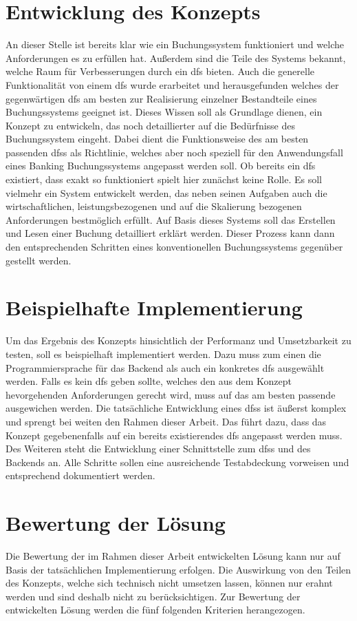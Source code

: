 \documentclass[12pt,oneside,a4paper,parskip]{scrbook}
\begin{document}
\section{Entwicklung des Konzepts}
An dieser Stelle ist bereits klar wie ein Buchungssystem funktioniert und welche Anforderungen es zu erfüllen hat. Außerdem sind die Teile des Systems bekannt, welche Raum für Verbesserungen durch ein \ac{dfs} bieten. Auch die generelle Funktionalität von einem \ac{dfs} wurde erarbeitet und herausgefunden welches der gegenwärtigen \ac{dfs} am besten zur Realisierung einzelner Bestandteile eines Buchungssystems geeignet ist. Dieses Wissen soll als Grundlage dienen, ein Konzept zu entwickeln, das noch detaillierter auf die Bedürfnisse des Buchungssystem eingeht. Dabei dient die Funktionsweise des am besten passenden \acp{dfs} als Richtlinie, welches aber noch speziell für den Anwendungsfall eines Banking Buchungssystems angepasst werden soll. Ob bereits ein \ac{dfs} existiert, dass exakt so funktioniert spielt hier zunächst keine Rolle. Es soll vielmehr ein System entwickelt werden, das neben seinen Aufgaben auch die wirtschaftlichen, leistungsbezogenen und auf die Skalierung bezogenen Anforderungen bestmöglich erfüllt. Auf Basis dieses Systems soll das Erstellen und Lesen einer Buchung detailliert erklärt werden. Dieser Prozess kann dann den entsprechenden Schritten eines konventionellen Buchungssystems gegenüber gestellt werden.

\section{Beispielhafte Implementierung}
Um das Ergebnis des Konzepts hinsichtlich der Performanz und Umsetzbarkeit zu testen, soll es beispielhaft implementiert werden.
Dazu muss zum einen die Programmiersprache für das Backend als auch ein konkretes \ac{dfs} ausgewählt werden. Falls es kein \ac{dfs} geben sollte, welches den aus dem Konzept hevorgehenden Anforderungen gerecht wird, muss auf das am besten passende ausgewichen werden. Die tatsächliche Entwicklung eines \acp{dfs} ist äußerst komplex und sprengt bei weiten den Rahmen dieser Arbeit. Das führt dazu, dass das Konzept gegebenenfalls auf ein bereits existierendes \ac{dfs} angepasst werden muss. Des Weiteren steht die Entwicklung einer Schnittstelle zum \acp{dfs} und des Backends an. Alle Schritte sollen eine ausreichende Testabdeckung vorweisen und entsprechend dokumentiert werden.

\section{Bewertung der Lösung}
Die Bewertung der im Rahmen dieser Arbeit entwickelten Lösung kann nur auf Basis der tatsächlichen Implementierung erfolgen. Die Auswirkung von den Teilen des Konzepts, welche sich technisch nicht umsetzen lassen, können nur erahnt werden und sind deshalb nicht zu berücksichtigen. Zur Bewertung der entwickelten Lösung werden die fünf folgenden Kriterien herangezogen.
\end{document}
